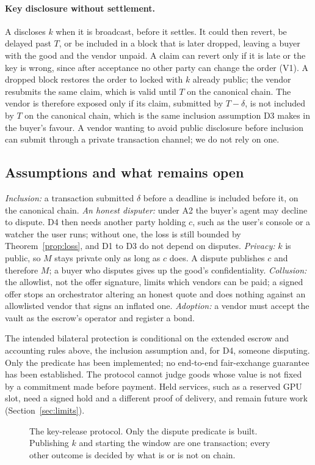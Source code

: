 \paragraph{Key disclosure without settlement.} A  discloses $k$ when it is broadcast, before it settles. It could then revert, be
delayed past $T$, or be included in a block that is later dropped, leaving a buyer with the good and the vendor unpaid. A claim can revert only if it is late or the key is
wrong, since after acceptance no other party can change the order (V1). A dropped block restores the order to locked with $k$ already public; the vendor
resubmits the same claim, which is valid until $T$ on the canonical chain. The vendor is therefore exposed only if its claim, submitted by $T - \delta$, is
not included by $T$ on the canonical chain, which is the same inclusion assumption D3 makes in the buyer's favour. A vendor wanting to avoid public
disclosure before inclusion can submit through a private transaction channel; we do not rely on one.

\subsection{Assumptions and what remains open}

\emph{Inclusion:} a transaction submitted $\delta$ before a deadline is included before it, on the canonical chain. \emph{An honest disputer:} under A2
the buyer's agent may decline to dispute. D4 then needs another party holding $c$, such as the user's console or a watcher the user runs; without one,
the loss is still bounded by Theorem~\ref{prop:loss}, and D1 to D3 do not depend on disputes. \emph{Privacy:} $k$ is public, so $M$ stays private only as
long as $c$ does. A dispute publishes $c$ and therefore $M$; a buyer who disputes gives up the good's confidentiality. \emph{Collusion:} the allowlist,
not the offer signature, limits which vendors can be paid; a signed offer stops an orchestrator altering an honest quote and does nothing against an
allowlisted vendor that signs an inflated one. \emph{Adoption:} a vendor must accept the vault as the escrow's operator and register a bond.

The intended bilateral protection is conditional on the extended escrow and accounting rules above, the inclusion assumption and, for D4, someone
disputing. Only the predicate has been implemented; no end-to-end fair-exchange guarantee has been established. The protocol cannot judge goods
whose value is not fixed by a commitment made before payment.
Held services, such as a reserved GPU slot, need a signed hold and a different proof of delivery, and remain future work (Section~\ref{sec:limits}).

\begin{figure}[t]
\centering
\resizebox{0.88\linewidth}{!}{}
\caption{The key-release protocol. Only the dispute predicate is built. Publishing $k$ and starting the window are one transaction; every other
outcome is decided by what is or is not on chain.}
\label{fig:exchange}
\end{figure}
